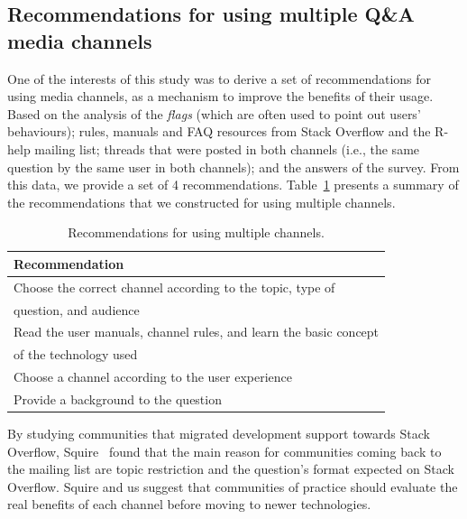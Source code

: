 \documentclass{sig-alternate-05-2015}
\begin{document}
\subsection{Recommendations for using multiple Q\&A media channels}

	One of the interests of this study was to derive a set of recommendations for using media channels, as a mechanism to improve the benefits of their usage.
	Based on the analysis of the \textit{flags} (which are often used to point out users' behaviours); rules, manuals and FAQ resources from Stack Overflow and the R-help mailing list; threads that were posted in both channels (i.e., the same question by the same user in both channels); and the answers of the survey.
	From this data, we provide a set of 4 recommendations.
	Table~\ref{table:recomendations} presents a summary of the recommendations that we constructed for using multiple channels.

    \begin{table}[!htb]
      \centering
	  \caption{Recommendations for using multiple channels.}
	  \label{table:recomendations}
	  \begin{tabular}{@{}l@{}}
        \toprule
        \textbf{Recommendation}\\
        \midrule
			Choose the correct channel according to the topic, type of\\
		    \hspace{3em}question, and audience \\
			Read the user manuals, channel rules, and learn the basic concept\\
			\hspace{3em}of the technology used \\
			Choose a channel according to the user experience \\
			Provide a background to the question \\
        \bottomrule
	  \end{tabular}
	\end{table}

By studying communities that migrated development support towards Stack Overflow, Squire~\cite{Squire2015a} found that the main reason for communities coming back to the mailing list are topic restriction and the question's format expected on Stack Overflow.
Squire and us suggest that communities of practice should evaluate the real benefits of each channel before moving to newer technologies.
\end{document}
